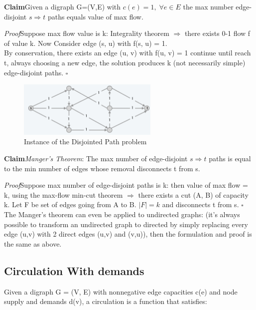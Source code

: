 \documentclass[11pt]{article}
\newenvironment{claim}[1]{\par\textbf{Claim}\space#1}{}
\newenvironment{proof}[1]{\par\textit{Proof}\space#1}{\hfill\ensuremath{\square}}
\begin{document}
\begin{claim}
Given a digraph G=(V,E) with $c(e) = 1,\; \forall e \in E$ the max number edge-disjoint $s \Rightarrow t $ paths equals value of max flow.
\end{claim}\\

\begin{proof}
Suppose max flow value is k: Integrality theorem $ \Rightarrow $  there exists 0-1 flow f of value k. Now Consider edge (s, u) with f(s, u) = 1.\\
By conservation, there exists an edge (u, v) with f(u, v) = 1 continue until reach t, always choosing a new edge, the solution produces k (not necessarily simple) edge-disjoint paths.
\end{proof}\\

\begin{figure}[H]
		\centering
		\includegraphics[width=0.6\textwidth ]{maxFlowDisjointed}
		\caption{Instance of the Disjointed Path problem}
\end{figure}

\begin{claim}
\emph{Manger's Theorem}: The max number of edge-disjoint $s \Rightarrow t$ paths is equal to the min number of edges whose removal disconnects t from s.
\end{claim}\\

\begin{proof}
Suppose max number of edge-disjoint paths is k: then value of max flow = k, using the max-flow min-cut theorem $  \Rightarrow $ there exists a cut (A, B) of capacity k. Let F be set of edges going from A to B.
$|F| = k$ and disconnects t from s.
\end{proof}\\

The Manger's theorem can even be applied to undirected graphs: (it's always possible to transform an undirected graph to directed by simply replacing every edge (u,v) with 2 direct edges (u,v) and (v,u)), then the formulation and proof is the same as above.

\subsection{Circulation With demands}
Given a digraph G = (V, E) with nonnegative edge capacities c(e) and node supply and demands d(v), a circulation is a function that satisfies:
\end{document}
